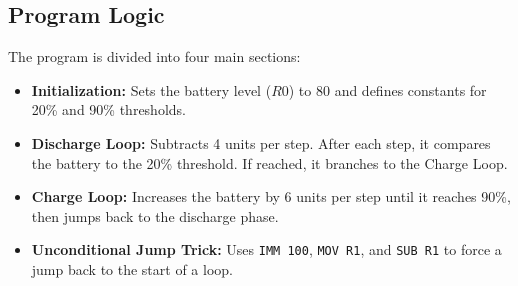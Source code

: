 \documentclass[12pt]{article}
\begin{document}
	\subsection{Program Logic}
	The program is divided into four main sections:
	\begin{itemize}
		\item \textbf{Initialization:} Sets the battery level ($R0$) to 80 and defines constants for 20\% and 90\% thresholds.
		\item \textbf{Discharge Loop:} Subtracts 4 units per step. After each step, it compares the battery to the 20\% threshold. If reached, it branches to the Charge Loop.
		\item \textbf{Charge Loop:} Increases the battery by 6 units per step until it reaches 90\%, then jumps back to the discharge phase.
		\item \textbf{Unconditional Jump Trick:} Uses \texttt{IMM 100}, \texttt{MOV R1}, and \texttt{SUB R1} to force a jump back to the start of a loop.
	\end{itemize}
	
	
\end{document}
